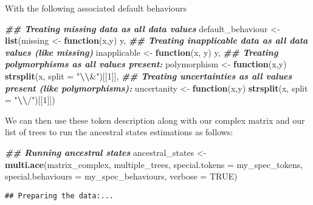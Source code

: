 \documentclass[
]{book}
\newenvironment{Shaded}{\begin{snugshade}}{\end{snugshade}}
\newcommand{\AttributeTok}[1]{\textcolor[rgb]{0.13,0.29,0.53}{#1}}
\newcommand{\ConstantTok}[1]{\textcolor[rgb]{0.56,0.35,0.01}{#1}}
\newcommand{\ControlFlowTok}[1]{\textcolor[rgb]{0.13,0.29,0.53}{\textbf{#1}}}
\newcommand{\DecValTok}[1]{\textcolor[rgb]{0.00,0.00,0.81}{#1}}
\newcommand{\DocumentationTok}[1]{\textcolor[rgb]{0.56,0.35,0.01}{\textbf{\textit{#1}}}}
\newcommand{\FunctionTok}[1]{\textcolor[rgb]{0.13,0.29,0.53}{\textbf{#1}}}
\newcommand{\NormalTok}[1]{#1}
\newcommand{\OtherTok}[1]{\textcolor[rgb]{0.56,0.35,0.01}{#1}}
\newcommand{\SpecialCharTok}[1]{\textcolor[rgb]{0.81,0.36,0.00}{\textbf{#1}}}
\newcommand{\StringTok}[1]{\textcolor[rgb]{0.31,0.60,0.02}{#1}}
\begin{document}
With the following associated default behaviours

\begin{Shaded}
\begin{Highlighting}[]
\DocumentationTok{\#\# Treating missing data as all data values}
\NormalTok{default\_behaviour }\OtherTok{\textless{}{-}} \FunctionTok{list}\NormalTok{(missing      }\OtherTok{\textless{}{-}} \ControlFlowTok{function}\NormalTok{(x,y) y,}
\DocumentationTok{\#\# Treating inapplicable data as all data values (like missing)    }
\NormalTok{                          inapplicable }\OtherTok{\textless{}{-}} \ControlFlowTok{function}\NormalTok{(x, y) y,}
\DocumentationTok{\#\# Treating polymorphisms as all values present:}
\NormalTok{                          polymorphism }\OtherTok{\textless{}{-}} \ControlFlowTok{function}\NormalTok{(x,y) }\FunctionTok{strsplit}\NormalTok{(x, }\AttributeTok{split =} \StringTok{"}\SpecialCharTok{\textbackslash{}\textbackslash{}}\StringTok{\&"}\NormalTok{)[[}\DecValTok{1}\NormalTok{]],}
\DocumentationTok{\#\# Treating uncertainties as all values present (like polymorphisms):}
\NormalTok{                          uncertanity  }\OtherTok{\textless{}{-}} \ControlFlowTok{function}\NormalTok{(x,y) }\FunctionTok{strsplit}\NormalTok{(x, }\AttributeTok{split =} \StringTok{"}\SpecialCharTok{\textbackslash{}\textbackslash{}}\StringTok{/"}\NormalTok{)[[}\DecValTok{1}\NormalTok{]])}
\end{Highlighting}
\end{Shaded}

We can then use these token description along with our complex matrix and our list of trees to run the ancestral states estimations as follows:

\begin{Shaded}
\begin{Highlighting}[]
\DocumentationTok{\#\# Running ancestral states}
\NormalTok{ancestral\_states }\OtherTok{\textless{}{-}} \FunctionTok{multi.ace}\NormalTok{(matrix\_complex, multiple\_trees,}
                              \AttributeTok{special.tokens =}\NormalTok{ my\_spec\_tokens,}
                              \AttributeTok{special.behaviours =}\NormalTok{ my\_spec\_behaviours,}
                              \AttributeTok{verbose =} \ConstantTok{TRUE}\NormalTok{)}
\end{Highlighting}
\end{Shaded}

\begin{verbatim}
## Preparing the data:...
\end{verbatim}
\end{document}
